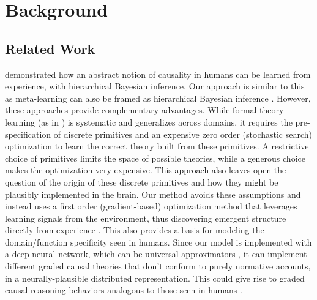 \section{Background}

\subsection{Related Work}

\citet{goodman2011learning} demonstrated how an abstract notion of causality in humans can be learned from experience, with hierarchical Bayesian inference. Our approach is similar to this as meta-learning can also be framed as hierarchical Bayesian inference \citep{grant2018recasting}. However, these approaches provide complementary advantages. While formal theory learning (as in \citet{goodman2011learning}) is systematic and generalizes across domains, it requires the pre-specification of discrete primitives and an expensive zero order (stochastic search) optimization to learn the correct theory built from these primitives. \citep{schulz2012finding, bramley2018grounding} A restrictive choice of primitives limits the space of possible theories, while a generous choice makes the optimization very expensive. This approach also leaves open the question of the origin of these discrete primitives and how they might be plausibly implemented in the brain. Our method avoids these assumptions and instead uses a first order (gradient-based) optimization method that leverages learning signals from the environment, thus discovering emergent structure directly from experience \citep{mcclelland2010letting}. This also provides a basis for modeling the domain/function specificity \citep{krynski2007role, lombrozo2010causal} seen in humans. Since our model is implemented with a deep neural network, which can be universal approximators \citep{siegelmann1995computational, hornik1991approximation}, it can implement different graded causal theories that don't conform to purely normative accounts, in a neurally-plausible distributed representation.  This could give rise to graded causal reasoning behaviors analogous to those seen in humans \citep{rehder2014independence, rehder2017failures, fernbach2010neglect, fernbach2013cognitive} . 


